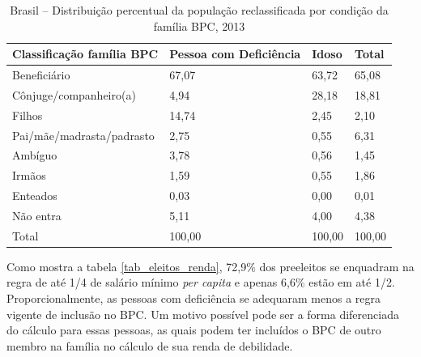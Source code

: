 \documentclass[
	12pt,				%
	openright,			%
	twoside,			%
	a4paper,			%
	english,			%
	french,				%
	spanish,			%
	brazil				%
	]{abntex2}
\begin{document}
\begin{table}[H]
	\footnotesize
	\centering
	\caption{Brasil -- Distribuição percentual da população reclassificada por condição da família BPC, 2013}
	\label{tab_reclass_cond}
	\begin{tabular}{@{}p{4.5cm}p{4cm}p{3cm}p{3cm}@{}}
		\toprule
		\textbf{Classificação família BPC} & \textbf{Pessoa com Deficiência} & \textbf{Idoso} & \textbf{Total} \\ \midrule
		Beneficiário                       & 67,07                           & 63,72          & 65,08          \\
		Cônjuge/companheiro(a)             & 4,94                            & 28,18          & 18,81          \\
		Filhos                             & 14,74                           & 2,45           & 2,10           \\
		Pai/mãe/madrasta/padrasto          & 2,75                            & 0,55           & 6,31           \\
		Ambíguo                            & 3,78                            & 0,56           & 1,45           \\
		Irmãos                             & 1,59                            & 0,55           & 1,86           \\
		Enteados                           & 0,03                            & 0,00           & 0,01           \\
		Não entra                          & 5,11                            & 4,00           & 4,38           \\ \midrule
		Total                              & 100,00                          & 100,00         & 100,00         \\ \bottomrule
	\end{tabular}
\end{table}

Como mostra a tabela \ref{tab_eleitos_renda}, 72,9\% dos preeleitos se enquadram na regra de até 1/4 de salário mínimo \textit{per capita} e apenas 6,6\% estão em até 1/2. Proporcionalmente, as pessoas com deficiência se adequaram menos a regra vigente de inclusão no BPC. Um motivo possível pode ser a forma diferenciada do cálculo para essas pessoas, as quais podem ter incluídos o BPC de outro membro na família no cálculo de sua renda de debilidade. 
\end{document}
